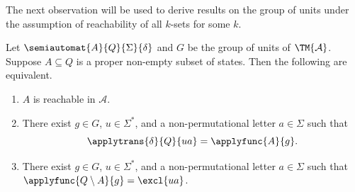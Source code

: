 The next observation will be used to derive results on 
the group of units under the assumption of reachability of all $k$-sets for some $k$.

\begin{lemma}
	\label{sync_max:prop:k-reach}
	Let $\semiautomat{A}{Q}{\Sigma}{\delta}$ and $G$ be the group of units of $\TM{\mathcal A}$.
	Suppose $A \subseteq Q$ is a proper non-empty subset of states.
	Then the following are equivalent.
	
	\begin{enumerate}
		\item \label{sync_max:prop:k-reach:item:Areach} $A$ is reachable in $\mathcal A$.
		
		\item \label{sync_max:prop:k-reach:grp-units-element} There exist $g \in G$, $u \in \Sigma^*$, and a non-permutational letter $a \in \Sigma$ such that
		\begin{equation}\label{sync_max:eqn:k_reach}
			\applytrans{\delta}{Q}{ua} = \applyfunc{A}{g}.
		\end{equation}
		
		\item \label{sync_max:prop:k-reach:complement} There exist $g \in G$, $u \in \Sigma^*$, and a non-permutational letter $a \in \Sigma$
		such that $\applyfunc{Q \setminus A}{g} = \excl{ua}$.
	\end{enumerate}
\end{lemma}
